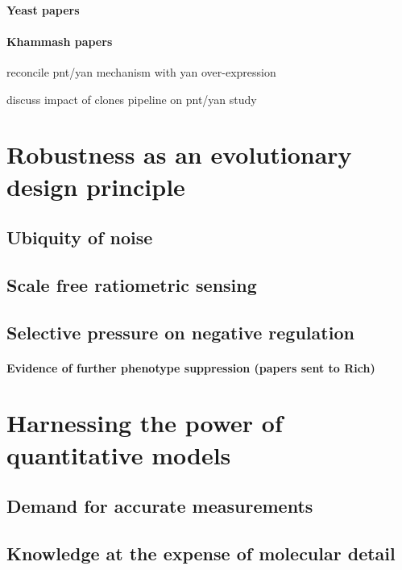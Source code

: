 		\paragraph{Yeast papers}
		\paragraph{Khammash papers}



reconcile pnt/yan mechanism with yan over-expression

discuss impact of clones pipeline on pnt/yan study


\section{Robustness as an evolutionary design principle}

	\subsection{Ubiquity of noise}	
	
	\subsection{Scale free ratiometric sensing}
	
	\subsection{Selective pressure on negative regulation}
	
		\paragraph{Evidence of further phenotype suppression (papers sent to Rich)}

\section{Harnessing the power of quantitative models}

	\subsection{Demand for accurate measurements}
	
	\subsection{Knowledge at the expense of molecular detail}
